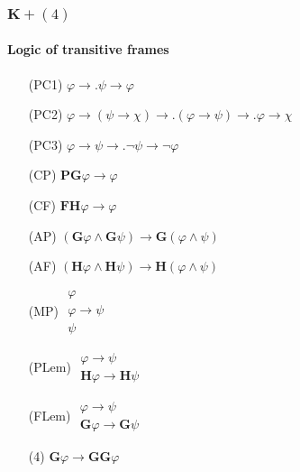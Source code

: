 \documentclass[xcolor=x11names]{beamer}
\newcommand{\FD}{\mathbf F}
\newcommand{\FB}{\mathbf G}
\newcommand{\PD}{\mathbf P}
\newcommand{\PB}{\mathbf H}
\newcommand{\lrule}[3][c]{\begin{array}{#1} #2  \\  \hline #3 \end{array}}
\newcommand{\lthen}{\rightarrow}
\begin{document}

\begin{frame}[t]
\frametitle{$\mathbf K+ (4)$}
\framesubtitle{Logic of transitive frames}
\footnotesize
\begin{minipage}[t]{5.78cm}
\begin{itemize}
\item[(PC1)] $\varphi \lthen .\psi \lthen \varphi$
\item[(PC2)] $\varphi\lthen (\psi \lthen \chi) \lthen\!\!. (\varphi \lthen \psi) \lthen\!\! . \varphi \lthen \chi$
\item[(PC3)] $\varphi \lthen \psi \lthen .\lnot \psi \lthen \lnot \varphi$
\item[(CP)] $\PD\FB\varphi \lthen \varphi $
\item[(CF)] $\FD\PB\varphi \lthen \varphi$
\item[(AP)] $(\FB\varphi \land \FB \psi )\lthen \FB(\varphi \land \psi )$
\item[(AF)] $(\PB\varphi \land \PB \psi )\lthen \PB(\varphi \land \psi )$
\item[(MP)] $\lrule {\varphi \\ \varphi \lthen \psi}{\psi}$
\item[(PLem)] $\lrule{\varphi\lthen \psi}{\PB\varphi \lthen \PB\psi}$
\item[(FLem)] $\lrule{\varphi\lthen \psi}{\FB\varphi \lthen \FB\psi}$
\end{itemize}
\end{minipage}
\begin{minipage}[t]{4cm}
\begin{itemize}
\item[(4)] $\FB\varphi\lthen \FB\FB\varphi$
\end{itemize}
\end{minipage}
\end{frame}

\end{document}
